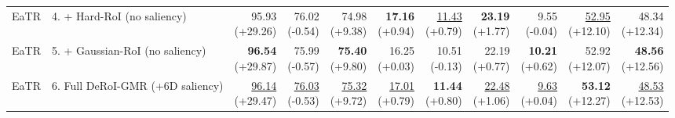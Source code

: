 \documentclass{article}
\begin{document}
{\begin{tabular}{llrrrrrrrrr}
EaTR & 4. + Hard-RoI (no saliency) & \shortstack{95.93 \\ {\scriptsize (+29.26)}} & \shortstack{76.02 \\ {\scriptsize (-0.54)}} & \shortstack{74.98 \\ {\scriptsize (+9.38)}} & \shortstack{\textbf{17.16} \\ {\scriptsize (+0.94)}} & \shortstack{\underline{11.43} \\ {\scriptsize (+0.79)}} & \shortstack{\textbf{23.19} \\ {\scriptsize (+1.77)}} & \shortstack{9.55 \\ {\scriptsize (-0.04)}} & \shortstack{\underline{52.95} \\ {\scriptsize (+12.10)}} & \shortstack{48.34 \\ {\scriptsize (+12.34)}} \\
EaTR & 5. + Gaussian-RoI (no saliency) & \shortstack{\textbf{96.54} \\ {\scriptsize (+29.87)}} & \shortstack{75.99 \\ {\scriptsize (-0.57)}} & \shortstack{\textbf{75.40} \\ {\scriptsize (+9.80)}} & \shortstack{16.25 \\ {\scriptsize (+0.03)}} & \shortstack{10.51 \\ {\scriptsize (-0.13)}} & \shortstack{22.19 \\ {\scriptsize (+0.77)}} & \shortstack{\textbf{10.21} \\ {\scriptsize (+0.62)}} & \shortstack{52.92 \\ {\scriptsize (+12.07)}} & \shortstack{\textbf{48.56} \\ {\scriptsize (+12.56)}} \\
EaTR & 6. Full DeRoI-GMR (+6D saliency) & \shortstack{\underline{96.14} \\ {\scriptsize (+29.47)}} & \shortstack{\underline{76.03} \\ {\scriptsize (-0.53)}} & \shortstack{\underline{75.32} \\ {\scriptsize (+9.72)}} & \shortstack{\underline{17.01} \\ {\scriptsize (+0.79)}} & \shortstack{\textbf{11.44} \\ {\scriptsize (+0.80)}} & \shortstack{\underline{22.48} \\ {\scriptsize (+1.06)}} & \shortstack{\underline{9.63} \\ {\scriptsize (+0.04)}} & \shortstack{\textbf{53.12} \\ {\scriptsize (+12.27)}} & \shortstack{\underline{48.53} \\ {\scriptsize (+12.53)}} \\

\end{tabular}}
\end{document}
